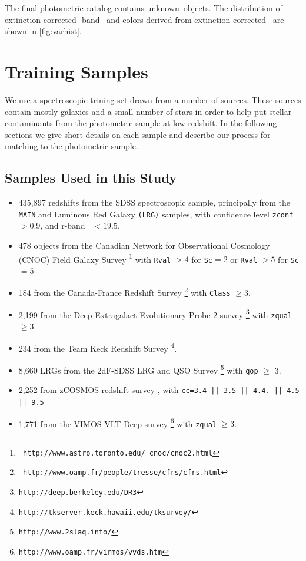 \documentclass[preprint]{aastex}
\newcommand{\nphoto}{unknown}
\begin{document}
The final photometric catalog contains \nphoto\ objects.  The distribution of
extinction corrected \rmag-band \cmodelmag\ and colors derived from extinction
corrected \modelmag\ are shown in \ref{fig:varhist}.

\section{Training Samples} \label{sec:train}

We use a spectroscopic trining set drawn from a number of sources. These
sources contain mostly galaxies and a small number of stars in order
to help put stellar contaminants from the photometric sample at low
redshift. In the following sections we give short details on each sample
and describe our process for matching to the photometric sample.

\subsection{Samples Used in this Study} \label{sec:train:def}

\begin{itemize} 

    \item 435,897 redshifts from the SDSS spectroscopic sample,
principally from the \texttt{MAIN} and Luminous Red Galaxy \texttt{(LRG)}
samples, with confidence level \texttt{zconf}$ > 0.9$, and r-band
\cmodelmag\ $ <19.5$.


    \item 478 objects from the Canadian Network for Observational
Cosmology (CNOC) Field Galaxy Survey \cite[CNOC2;][]{yee00}\footnote{\tt
http://www.astro.toronto.edu/~cnoc/cnoc2.html} with \texttt{Rval} $>4$
for \texttt{Sc}$=2$ or \texttt{Rval} $> 5$ for \texttt{Sc}$=5$

    \item 184 from the Canada-France Redshift
Survey \cite[CFRS;][]{lilly95}\footnote{\tt
http://www.oamp.fr/people/tresse/cfrs/cfrs.html} with \texttt{Class} $\geq 3$.

    \item 2,199 from the Deep Extragalact Evolutionary Probe 2 survey
\citep[DEEP2;][]{weiner05}\footnote{\tt http://deep.berkeley.edu/DR3}
with \texttt{zqual} $\geq 3$

    \item 234 from the Team Keck Redshift Survey \cite[TKRS;][]{wirth04}\footnote{\tt http://tkserver.keck.hawaii.edu/tksurvey/}.

    \item 8,660 LRGs from the 2dF-SDSS LRG and QSO Survey \cite[2SLAQ;][]{cannon06}\footnote{\tt http://www.2slaq.info/} with \texttt{qop} $\geq$ 3.

    \item  2,252 from zCOSMOS redshift survey \cite{lilly07}, with  \texttt{cc=3.4 || 3.5 || 4.4.  || 4.5 || 9.5}
    
    \item 1,771 from the VIMOS VLT-Deep survey \cite[VVDS;][]{garilli08}\footnote{\tt http://www.oamp.fr/virmos/vvds.htm} with \texttt{zqual} $\geq 3$.

\end{itemize}
\end{document}

